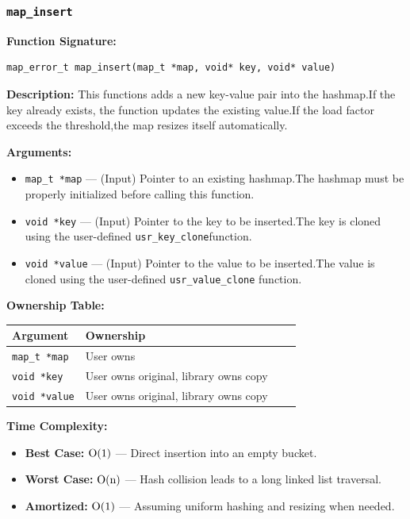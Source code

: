 \documentclass[titlepage]{article}
\begin{document}
\subsubsection{\texttt{map\_insert}}
\textbf{Function Signature:}
\begin{verbatim}
map_error_t map_insert(map_t *map, void* key, void* value)
\end{verbatim}

\textbf{Description:} This functions adds a new key-value pair into the hashmap.If the key already exists, the function updates the existing
value.If the load factor exceeds the threshold,the map resizes itself automatically.

\textbf{Arguments:}
\begin{itemize}
\item\texttt{map\_t *map} --- (Input) Pointer to an existing hashmap.The hashmap must be properly initialized before calling this function.
\item\texttt{void *key} --- (Input) Pointer to the key to be inserted.The key is cloned using the user-defined \texttt{usr\_key\_clone}function.
\item\texttt{void *value} --- (Input) Pointer to the value to be inserted.The value is cloned using the user-defined \texttt{usr\_value\_clone}
function.
\end{itemize}

\textbf{Ownership Table:}
\begin{center}
\begin{tabular}{@{} l l c c @{} }
\toprule
\textbf{Argument} & \textbf{Ownership}  \\
\midrule
\texttt{map\_t *map} & User owns \\
\texttt{void *key} & User owns original, library owns copy  \\
\texttt{void *value} & User owns original, library owns copy  \\
\bottomrule
\end{tabular}
\end{center}

\textbf{Time Complexity:}
\begin{itemize}
\item \textbf{Best Case:} \( $O(1)$ \) --- Direct insertion into an empty bucket.
\item \textbf{Worst Case:} \( $O(n)$ \) --- Hash collision leads to a long linked list traversal.
\item \textbf{Amortized:} \( $O(1)$ \) --- Assuming uniform hashing and resizing when needed.
\end{itemize}
\end{document}
